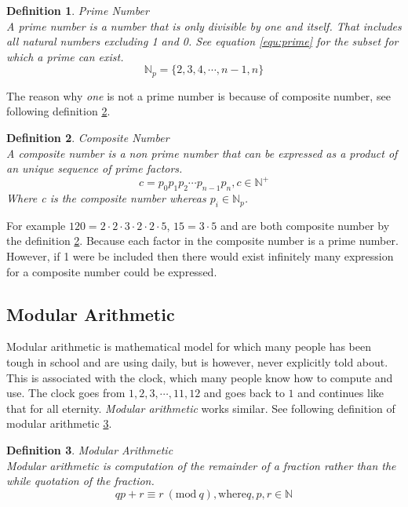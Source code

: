 \documentclass[12pt, oneside, onecolumn]{article}
\newtheorem{definition}{Definition}[section]
\newcommand{\Mod}[1]{\ (\mathrm{mod}\ #1)}
\begin{document}
\begin{definition}{Prime Number}\label{def:prime}
\\
A \emph{prime number} is a number that is only divisible by one and itself. That includes all natural numbers excluding 1 and 0. See equation \ref{equ:prime} for the subset for which a prime can exist.
\begin{equation}
\mathbb{N}_{p} = \{2,3,4,\cdots,n-1,n\}
\end{equation}\label{equ:prime}
\end{definition}

The reason why \emph{one} is not a prime number is because of composite number, see following definition \ref{def:comp}.

\begin{definition}{Composite Number}\label{def:comp}
\\
A composite number is a non prime number that can be expressed as a product of an unique sequence of prime factors.
\begin{equation}
c = p_0 p_1 p_2 \cdots p_{n-1} p_{n}, c \in \mathbb{N}^{+}
\end{equation}
Where c is the composite number whereas $p_{i} \in \mathbb{N}_{p}$.
\end{definition}

For example $120 = 2 \cdot 2 \cdot 3 \cdot 2 \cdot 2 \cdot 5$, $15 = 3 \cdot 5$ and are both composite number by the definition \ref{def:comp}. Because each factor in the composite number is a prime number. However, if 1 were be included then there would exist infinitely many expression for a composite number could be expressed.

%
\subsection{Modular Arithmetic}\label{sec:mod}
Modular arithmetic is mathematical model for which many people has been tough in school and are using daily, but is however, never explicitly told about. This is associated with the clock, which many people know how to compute and use. The clock goes from $1,2,3,\cdots,11,12$ and goes back to $1$ and continues like that for all eternity. \textit{Modular arithmetic} works similar. See following definition of modular arithmetic \ref{def:modular}.

\begin{definition}{Modular Arithmetic}\label{def:modular}
\\
Modular arithmetic is computation of the remainder of a fraction rather than the while quotation of the fraction.
\begin{equation}
qp +r \equiv r \Mod{q}, \text{where} q, p, r \in \mathbb{N}
\end{equation}
\end{definition}
\end{document}
